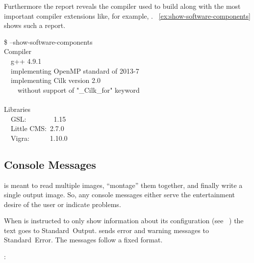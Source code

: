 %
Furthermore the report reveals the compiler used to build \appcmd{} along with the most
important compiler extensions like, for example, .
\exampleName~\ref{ex:show-software-components} shows such a report.

\begin{exemplar}
  \begin{terminal}
    \$ \app{} --show-software-components \\
    Compiler \\
    ~~g++ 4.9.1 \\
    ~~implementing OpenMP standard of 2013-7 \\
    ~~implementing Cilk version 2.0 \\
    ~~~~without support of "\_Cilk\_for" keyword \\
    ~ \\
    Libraries \\
    ~~GSL:~~~~~~~~1.15 \\
    ~~Little CMS:~2.7.0 \\
    ~~Vigra:~~~~~~1.10.0
  \end{terminal}

  \caption[Output of ]%
          {\label{ex:show-software-components}%
            Output of \appcmd{} when asked to reveal the compiler that was used to build it
            along with the libraries it was linked against.}
\end{exemplar}


\subsection[Console Messages]{\label{sec:console-messages}%
  Console Messages}

\App{} is meant to read multiple images, ``montage'' them together, and finally write a single
output image.  So, any console messages either serve the entertainment desire of the user or
indicate problems.

%
When \appcmd{} is instructed to only show information about its configuration (see
\sectionName~) the text goes to Standard~Output.  \appcmd{}
sends error and warning messages to Standard~Error.  The messages follow a fixed format.

\begin{literal}
  \app:  
\end{literal}

